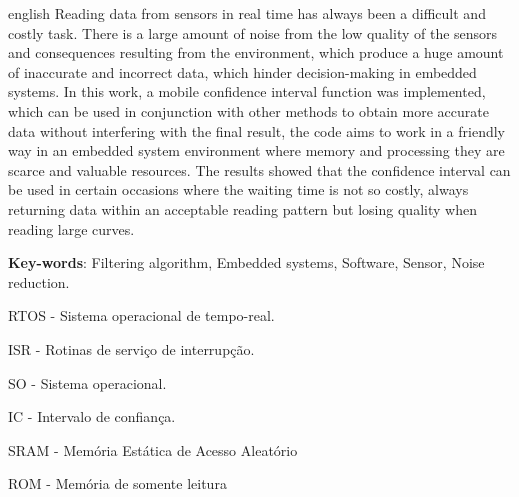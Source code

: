 \begin{resumo}[Abstract]
	\begin{otherlanguage*}{english}
		Reading data from sensors in real time has always been a difficult and costly task. There is a large amount of noise from the low quality of the sensors and consequences resulting from the environment, which produce a huge amount of inaccurate and incorrect data, which hinder decision-making in embedded systems.
		In this work, a mobile confidence interval function was implemented, which can be used in conjunction with other methods to obtain more accurate data without interfering with the final result, the code aims to work in a friendly way in an embedded system environment where memory and processing they are scarce and valuable resources. The results showed that the confidence interval can be used in certain occasions where the waiting time is not so costly, always returning data within an acceptable reading pattern but losing quality when reading large curves.
		\vspace{\onelineskip}

		\noindent
		\textbf{Key-words}: Filtering algorithm, Embedded systems, Software, Sensor, Noise reduction.
	\end{otherlanguage*}
\end{resumo}


\listoffigures*

\newpage
{}
\newpage
\listoftables*
\cleardoublepage

\begin{siglas}
	\item RTOS - Sistema operacional de tempo-real.
	\item ISR - Rotinas de serviço de interrupção.
	\item SO - Sistema operacional.
	\item IC - Intervalo de confiança.
	\item SRAM - Memória Estática de Acesso Aleatório
	\item ROM - Memória de somente leitura
\end{siglas}


\tableofcontents*
\cleardoublepage

